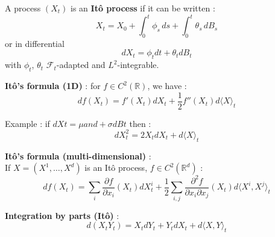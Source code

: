 \begin{f}
	
A process \((X_t)\) is an \textbf{Itô process} if it can be written :
	\[
	X_t = X_0 + \int_0^t \phi_s\, ds + \int_0^t \theta_s\, dB_s
	\]
	or in differential
	\[dX_t = \phi_t dt + \theta_t dB_t\]
	with \(\phi_t\), \(\theta_t\) \(\mathcal{F}_t\)-adapted and \(L^2\)-integrable.
	
	\textbf{Itô's formula (1D)} : for \(f \in C^2(\mathbb{R})\), we have :
	\[
	df(X_t) = f'(X_t) dX_t + \frac{1}{2} f''(X_t) d\langle X \rangle_t
	\]
	
	Example : if \(dXt = \mu and + \sigma dBt\) then :
	\[
	dX_t^2 = 2X_t dX_t + d\langle X \rangle_t
	\]
	
	\textbf{Itô's formula (multi-dimensional)} :\\
	If \(X = (X^1, \dots, X^d)\) is an Itô process, \(f \in C^2(\mathbb{R}^d)\) :
	\[
	df(X_t) = \sum_i \frac{\partial f}{\partial x_i}(X_t) dX^i_t
	+ \frac{1}{2} \sum_{i,j} \frac{\partial^2 f}{\partial x_i \partial x_j}(X_t) d\langle X^i, X^j \rangle_t
	\]
	
	\textbf{Integration by parts (Itô)} :
	\[
	d(X_t Y_t) = X_t dY_t + Y_t dX_t + d\langle X, Y \rangle_t
	\]
	
\end{f}

